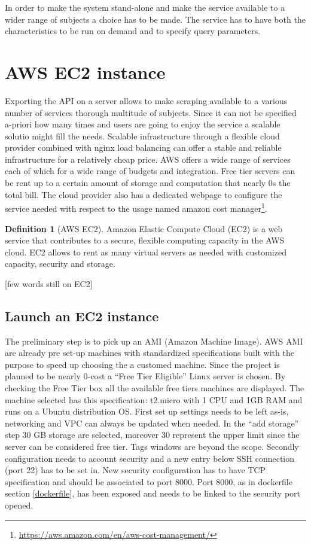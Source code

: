 \documentclass[
  12pt,
  a4paper,
  oneside]{book}
\DeclareRobustCommand{\href}[2]{#2\footnote{\url{#1}}}
\theoremstyle{definition}
\newtheorem{definition}{Definition}[chapter]
\theoremstyle{definition}
\theoremstyle{definition}
\theoremstyle{remark}
\begin{document}
In order to make the system stand-alone and make the service available to a wider range of subjects a choice has to be made. The service has to have both the characteristics to be run on demand and to specify query parameters.

\hypertarget{aws}{%
\section{AWS EC2 instance}\label{aws}}

Exporting the API on a server allows to make scraping available to a various number of services thorough multitude of subjects. Since it can not be specified a-priori how many times and users are going to enjoy the service a scalable solutio might fill the needs. Scalable infrastructure through a flexible cloud provider combined with nginx load balancing can offer a stable and reliable infrastructure for a relatively cheap price.
AWS offers a wide range of services each of which for a wide range of budgets and integration. Free tier servers can be rent up to a certain amount of storage and computation that nearly 0s the total bill. The cloud provider also has a dedicated webpage to configure the service needed with respect to the usage named \href{https://aws.amazon.com/en/aws-cost-management/}{amazon cost manager}.

\begin{definition}[AWS EC2]
\protect\hypertarget{def:aws}{}{\label{def:aws} {} }Amazon Elastic Compute Cloud (EC2) is a web service that contributes to a secure, flexible computing capacity in the AWS cloud. EC2 allows to rent as many virtual servers as needed with customized capacity, security and storage.
\end{definition}

{[}few words still on EC2{]}

\hypertarget{launch-an-ec2-instance}{%
\subsection{Launch an EC2 instance}\label{launch-an-ec2-instance}}

The preliminary step is to pick up an AMI (Amazon Machine Image). AWS AMI are already pre set-up machines with standardized specifications built with the purpose to speed up choosing the a customed machine. Since the project is planned to be nearly 0-cost a ``Free Tier Eligible'' Linux server is chosen. By checking the Free Tier box all the available free tiers machines are displayed. The machine selected has this specification: t2.micro with 1 CPU and 1GB RAM and runs on a Ubuntu distribution OS. First set up settings needs to be left as-is, networking and VPC can always be updated when needed. In the ``add storage'' step 30 GB storage are selected, moreover 30 represent the upper limit since the server can be considered free tier. Tags windows are beyond the scope. Secondly configuration needs to account security and a new entry below SSH connection (port 22) has to be set in. New security configuration has to have TCP specification and should be associated to port 8000. Port 8000, as in dockerfile section \ref{dockerfile}, has been exposed and needs to be linked to the security port opened.
\end{document}
